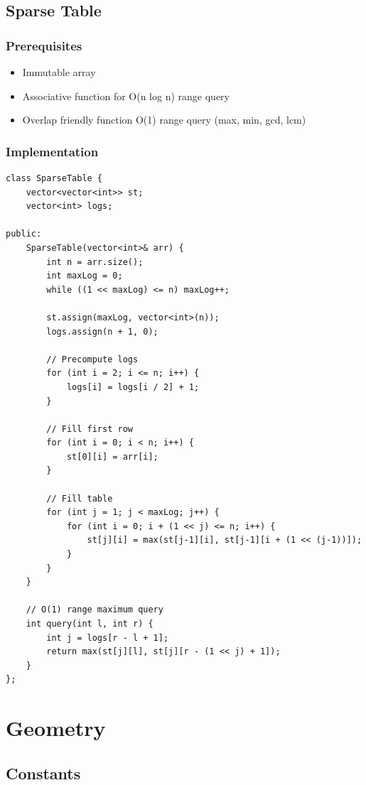 \documentclass[10pt]{article}
\begin{document}
\begin{multicols*}{2}
\subsection{Sparse Table}
\subsubsection{Prerequisites}
\begin{itemize}
    \item Immutable array
    \item Associative function for O(n log n) range query
    \item Overlap friendly function O(1) range query (max, min, gcd, lcm)
\end{itemize}

\subsubsection{Implementation}
\begin{lstlisting}[style=compactcpp]
class SparseTable {
    vector<vector<int>> st;
    vector<int> logs;

public:
    SparseTable(vector<int>& arr) {
        int n = arr.size();
        int maxLog = 0;
        while ((1 << maxLog) <= n) maxLog++;

        st.assign(maxLog, vector<int>(n));
        logs.assign(n + 1, 0);

        // Precompute logs
        for (int i = 2; i <= n; i++) {
            logs[i] = logs[i / 2] + 1;
        }

        // Fill first row
        for (int i = 0; i < n; i++) {
            st[0][i] = arr[i];
        }

        // Fill table
        for (int j = 1; j < maxLog; j++) {
            for (int i = 0; i + (1 << j) <= n; i++) {
                st[j][i] = max(st[j-1][i], st[j-1][i + (1 << (j-1))]);
            }
        }
    }

    // O(1) range maximum query
    int query(int l, int r) {
        int j = logs[r - l + 1];
        return max(st[j][l], st[j][r - (1 << j) + 1]);
    }
};
\end{lstlisting}

\section{Geometry}

\subsection{Constants}

\end{multicols*}
\end{document}
